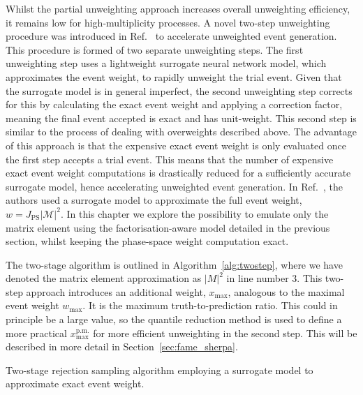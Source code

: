 \documentclass[main.tex]{subfiles}
\begin{document}
Whilst the partial unweighting approach increases overall unweighting efficiency,
it remains low for high-multiplicity processes.
A novel two-step unweighting procedure was introduced in Ref.~\cite{Danziger:2021eeg}
to accelerate unweighted event generation. This procedure is formed of two separate
unweighting steps. The first unweighting step uses
a lightweight surrogate neural network model, which approximates the event weight,
to rapidly unweight the trial event. Given that the surrogate model is in general imperfect, the
second unweighting step corrects for this by calculating the exact event weight
and applying a correction factor, meaning the final event accepted is exact and has
unit-weight. This second step is similar to the process of dealing with overweights described
above.
The advantage of this approach is that the expensive exact event weight is only
evaluated once the first step accepts a trial event. This means that the number of 
expensive exact event weight computations is drastically reduced for a sufficiently accurate
surrogate model, hence accelerating unweighted event generation. In Ref.~\cite{Danziger:2021eeg},
the authors used a surrogate model to approximate the full event weight, 
$w = J_{\mathrm{PS}} |\mathcal{M}|^{2}$. In this chapter we explore the possibility
to emulate only the matrix element using the factorisation-aware model detailed in the
previous section, whilst keeping the phase-space weight computation exact.

The two-stage algorithm is outlined in Algorithm~\ref{alg:twostep}, where we have
denoted the matrix element approximation as $|M|^{2}$ in line number 3. This
two-step approach introduces an additional weight, $x_{\mathrm{max}}$, analogous
to the maximal event weight $w_{\mathrm{max}}$. It is the maximum truth-to-prediction
ratio. This could in principle be a large value, so the quantile reduction method
is used to define a more practical $x_{\mathrm{max}}^{\mathrm{p.m.}}$ for more efficient
unweighting in the second step. This will be described in more detail in Section~\ref{sec:fame_sherpa}.
\begin{algorithm}[ht]
    \caption{Two-stage rejection sampling algorithm employing
    a surrogate model to approximate exact event weight.}
    \label{alg:twostep}
\end{algorithm}
\end{document}
